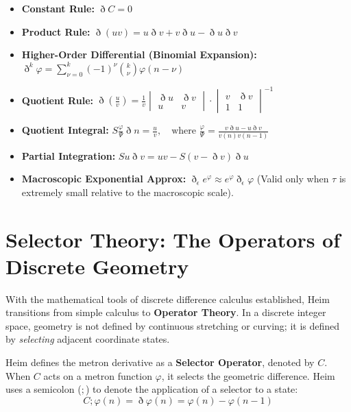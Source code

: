 \documentclass[11pt,a4paper,oneside]{article}
\newcommand{\ethop}{\eth}
\begin{document}
\begin{tcolorbox}[colback=white, colframe=theoryblue, title=\textbf{Key Rules of Metron Calculus}]
\begin{itemize}
    \item \textbf{Constant Rule:} $\ethop C = 0$
    \item \textbf{Product Rule:} $\ethop (uv) = u \ethop v + v \ethop u - \ethop u \ethop v$
    \item \textbf{Higher-Order Differential (Binomial Expansion):} $\displaystyle \ethop^k \varphi = \sum_{\nu=0}^{k} (-1)^\nu \binom{k}{\nu} \varphi(n-\nu)$
    \item \textbf{Quotient Rule:} $\ethop \left( \frac{u}{v} \right) = \frac{1}{v} \begin{vmatrix} \ethop u & \ethop v \\ u & v \end{vmatrix} \cdot \begin{vmatrix} v & \ethop v \\ 1 & 1 \end{vmatrix}^{-1}$
    \item \textbf{Quotient Integral:} $\displaystyle S \frac{\varphi}{\Psi} \ethop n = \frac{u}{v}, \quad \text{where } \frac{\varphi}{\Psi} = \frac{v \ethop u - u \ethop v}{v(n)v(n-1)}$
    \item \textbf{Partial Integration:} $S u \ethop v = uv - S (v - \ethop v) \ethop u$
    \item \textbf{Macroscopic Exponential Approx:} $\ethop_\epsilon e^\varphi \approx e^\varphi \ethop_\epsilon \varphi$ (Valid only when $\tau$ is extremely small relative to the macroscopic scale).
\end{itemize}
\end{tcolorbox}

\section{Selector Theory: The Operators of Discrete Geometry}
\label{sec:selector_theory}

With the mathematical tools of discrete difference calculus established, Heim transitions from simple calculus to \textbf{Operator Theory}. In a discrete integer space, geometry is not defined by continuous stretching or curving; it is defined by \textit{selecting} adjacent coordinate states.

Heim defines the metron derivative as a \textbf{Selector Operator}, denoted by $C$. When $C$ acts on a metron function $\varphi$, it selects the geometric difference. Heim uses a semicolon ($;$) to denote the application of a selector to a state:
\begin{equation}
    C; \varphi(n) = \ethop \varphi(n) = \varphi(n) - \varphi(n-1)
\end{equation}
\end{document}
